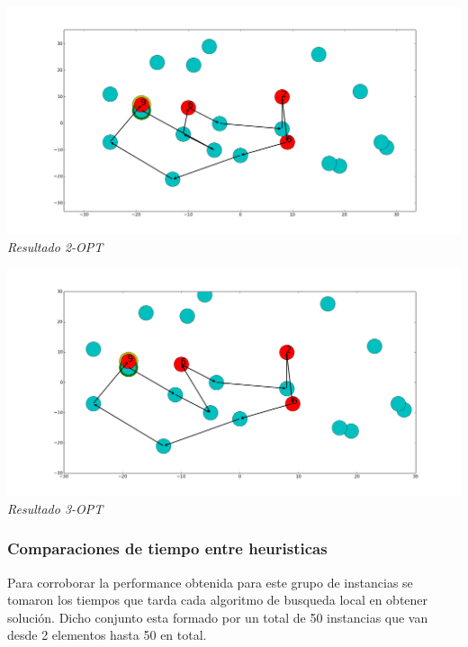   \vspace*{0.3cm} \vspace*{0.3cm}
  \begin{center}
\includegraphics[scale=0.3]{./EJ5/caminoEj2opt.png}
\\{\textit{Resultado 2-OPT}}
  \end{center}
  \vspace*{0.3cm}
  
    \vspace*{0.3cm} \vspace*{0.3cm}
  \begin{center}
\includegraphics[scale=0.3]{./EJ5/caminoEj3opt.png}
\\{\textit{Resultado 3-OPT}}
  \end{center}
  \vspace*{0.3cm}

\subsubsection{Comparaciones de tiempo entre heuristicas}

Para corroborar la performance obtenida para este grupo de instancias se tomaron los tiempos que tarda cada algoritmo de busqueda local en obtener soluci\'on. 
Dicho conjunto esta formado por un total de 50 instancias que van desde 2 elementos hasta 50 en total.

